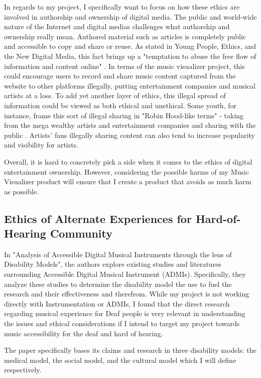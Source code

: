 \documentclass[10pt,twocolumn]{article}
\begin{document}
In regards to my project, I specifically want to focus on how these ethics are involved in authorship and ownership of digital media. The public and world-wide nature of the Internet and digital medias challenges what authorship and ownership really mean. Authored material such as articles is completely public and accessible to copy and share or reuse. As stated in Young People, Ethics, and the New Digital Media, this fact brings up a "temptation to abuse the free flow of information and content online" \cite{mitYoungPeople}. 
In terms of the music visualizer project, this could encourage users to record and share music content captured from the website to other platforms illegally, putting entertainment companies and musical artists at a loss. 
To add yet another layer of ethics, this illegal spread of information could be viewed as both ethical and unethical. Some youth, for instance, frame this sort of illegal sharing in "Robin Hood-like terms" - taking from the mega wealthy artists and entertainment companies and sharing with the public \cite{mitYoungPeople}. Artists' fans illegally sharing content can also tend to increase popularity and visibility for artists.

Overall, it is hard to concretely pick a side when it comes to the ethics of digital entertainment ownership. However, considering the possible harms of my Music Visualizer product will ensure that I create a product that avoids as much harm as possible.
\subsection{Ethics of Alternate Experiences for Hard-of-Hearing Community}
In "Analysis of Accessible Digital Musical Instruments through the lens of Disability Models", the authors explore existing studies and literatures surrounding Accessible Digital Musical Instrument (ADMIs)\cite{ADMIs}. Specifically, they analyze these studies to determine the disability model the use to fuel the research and their effectiveness and therefrom. While my project is not working directly with Instrumentation or ADMIs, I found that the direct research regarding musical experience for Deaf people is very relevant in understanding the issues and ethical considerations if I intend to target my project towards music accessibility for the deaf and hard of hearing. 

The paper specifically bases its claims and research in three disability models: the medical model, the social model, and the cultural model which I will define respectively. 
\end{document}
